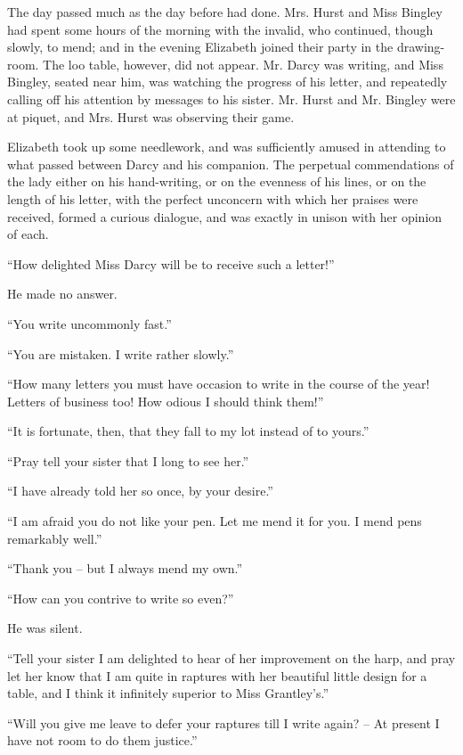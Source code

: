 
The day passed much as the day before had done.
Mrs. Hurst and Miss Bingley had spent some hours of the
morning with the invalid, who continued, though slowly,
to mend; and in the evening Elizabeth joined their party
in the drawing-room. The loo table, however, did not
appear. Mr. Darcy was writing, and Miss Bingley, seated
near him, was watching the progress of his letter, and
repeatedly calling off his attention by messages to his
sister. Mr. Hurst and Mr. Bingley were at piquet, and
Mrs. Hurst was observing their game.

Elizabeth took up some needlework, and was sufficiently
amused in attending to what passed between Darcy and
his companion. The perpetual commendations of the
lady either on his hand-writing, or on the evenness of
his lines, or on the length of his letter, with the perfect
unconcern with which her praises were received, formed
a curious dialogue, and was exactly in unison with her
opinion of each.

“How delighted Miss Darcy will be to receive such
a letter!”

He made no answer.

“You write uncommonly fast.”

“You are mistaken. I write rather slowly.”

“How many letters you must have occasion to write
in the course of the year! Letters of business too! How
odious I should think them!”

“It is fortunate, then, that they fall to my lot instead
of to yours.”

“Pray tell your sister that I long to see her.”

“I have already told her so once, by your desire.”

“I am afraid you do not like your pen. Let me mend
it for you. I mend pens remarkably well.”

“Thank you -- but I always mend my own.”

“How can you contrive to write so even?”

He was silent.

“Tell your sister I am delighted to hear of her improvement
on the harp, and pray let her know that I am quite
in raptures with her beautiful little design for a table,
and I think it infinitely superior to Miss Grantley’s.”

“Will you give me leave to defer your raptures till
I write again? -- At present I have not room to do them
justice.”

